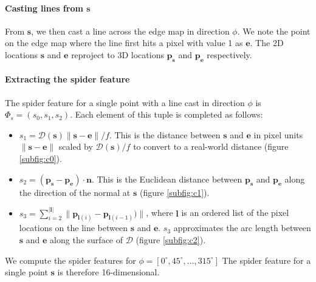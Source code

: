 \documentclass[10pt,twocolumn,letterpaper]{article}
\newcommand{\degree}{^{\circ}}
\newcommand{\rgbdimage}{\mathcal{D}}
\newcommand{\pixelidx}{\mathbf{s}}
\newcommand{\edgeimidx}{\mathbf{e}}
\newcommand{\project}{\mathbf{p}}
\newcommand{\point}{\mathbf{p}}
\newcommand{\normal}{\mathbf{n}}
\begin{document}
\paragraph{Casting lines from $\pixelidx$}
From $\pixelidx$, we then cast a line across the edge map in direction $\phi$.
We note the point on the edge map where the line first hits a pixel with value 1 as $\edgeimidx$.
The 2D locations $\pixelidx$ and $\edgeimidx$ reproject to 3D locations $\project_\pixelidx$ and $\project_\edgeimidx$ respectively.





\paragraph{Extracting the spider feature}

\newcommand{\spiderfeat}{s}

The spider feature for a single point with a line cast in direction $\phi$ is $\Phi_s = (\spiderfeat_0, \spiderfeat_1, \spiderfeat_2)$.
Each element of this tuple is completed as follows:
\begin{itemize}

\item $\spiderfeat_1 = \rgbdimage(\pixelidx) \|\pixelidx - \edgeimidx\| / f$. This is the distance between $\pixelidx$ and $\edgeimidx$ in pixel units $\|\pixelidx - \edgeimidx\|$ scaled by $\rgbdimage(\pixelidx) / f$ to convert to a real-world distance (figure \ref{subfig:c0}).

\item $\spiderfeat_2 = (\point_\pixelidx - \point_\edgeimidx) \cdot \normal$. 
This is the Euclidean distance between $\point_\pixelidx$ and $\point_\edgeimidx$ along the direction of the normal at $\pixelidx$  (figure \ref{subfig:c1}).
\newcommand{\gline}{\mathbf{l}}
\item $\spiderfeat_3 = \sum_{i=2}^{|\gline|} \| \project_{\gline(i)} - \project_{\gline(i-1)}) \| $, where $\gline$ is an ordered list of the pixel locations on the line between $\pixelidx$ and $\edgeimidx$.
$\spiderfeat_3$ approximates the arc length between $\pixelidx$ and $\edgeimidx$ along the surface of $\rgbdimage$  (figure \ref{subfig:c2}).
\end{itemize}

We compute the spider features for  $\phi = [0\degree, 45\degree, \ldots, 315\degree]$
The spider feature for a single point $\pixelidx$ is therefore 16-dimensional.
\end{document}
